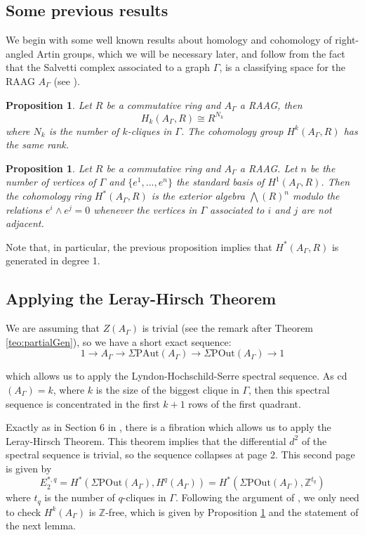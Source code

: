 \documentclass[a4paper]{amsart}
\newcommand{\Z}{\mathbb{Z}}
\newcommand{\G}{\Gamma}
\newcommand{\A}{{A_\Gamma}}
\newcommand{\PAut}{\Sigma\mathrm{PAut}}
\newcommand{\POut}{\Sigma\mathrm{POut}}
\newtheorem{prop}[teo]{Proposition}
\theoremstyle{definition}
\theoremstyle{remark}
\begin{document}
\subsection{Some previous results}
We begin with some well known results about homology and cohomology of right-angled Artin groups, which we will be necessary later, and follow from the fact that the Salvetti complex associated to a graph $\G$, is a classifying space for the RAAG $A_\G$ (see \cite{Kob}). 

\begin{prop}
    Let $R$ be a commutative ring and $A_\G$ a RAAG, then
    $$
        H_k(A_\G,R)\cong R^{N_k}
    $$
    where $N_k$ is the number of $k$-cliques in $\G$. The cohomology group $H^k(A_\G,R)$ has the same rank.\label{prop:HomRaag}
\end{prop}

\begin{prop}
    Let $R$ be a commutative ring and $A_\G$ a RAAG. Let $n$ be the number of vertices of $\G$ and $\{e^1,...,e^n\}$ the standard basis of $H^1(\A,R)$. Then the cohomology ring $H^\ast(A_\G,R)$ is the exterior algebra $\bigwedge\left(R\right)^n$  modulo the relations $e^i\wedge e^j=0$ whenever the  vertices in $\G$ associated to $i$ and $j$ are not adjacent.  \label{prop:1clases}
\end{prop}

\noindent Note that, in particular, the previous proposition implies that $H^\ast(A_\G,R)$ is generated in degree 1. 


\subsection{Applying the Leray-Hirsch Theorem}
We are assuming that $Z(\A)$ is trivial (see the remark after Theorem \ref{teo:partialGen}), so we have a  short exact sequence:
$$
1\to A_\G\to \PAut(A_\G)\to \POut(A_\G) \to 1
$$


\noindent which allows us to apply the Lyndon-Hochschild-Serre spectral sequence. As cd$(A_\G)=k$, where $k$ is the size of the biggest clique in $\G$, then this spectral sequence is concentrated in the first $k+1$ rows of the first quadrant. 

Exactly as in Section 6 in \cite{JMcCM}, there is a fibration which allows us to apply the Leray-Hirsch Theorem. This theorem implies that the differential $d^2$ of the spectral sequence is trivial, so the sequence collapses at page 2. This second page is  given by
$$E_2^{*, q}=H^*(\POut(A_\G), H^q(A_\G))=H^*(\POut(A_\G),\Z^{t_q})$$
where $t_q$ is the number of $q$-cliques in $\G$.  Following the argument of \cite{JMcCM}, we only need to check $H^k(\A)$ is $\Z$-free, which is given by Proposition \ref{prop:HomRaag} and the statement of the next lemma.
\end{document}
